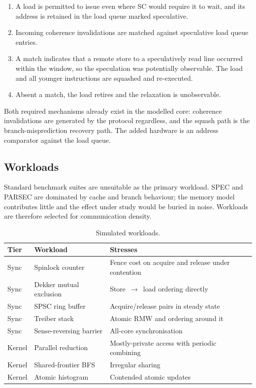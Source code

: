 \begin{enumerate}
\item A load is permitted to issue even where SC would require it to wait, and its
  address is retained in the load queue marked speculative.
\item Incoming coherence invalidations are matched against speculative load queue
  entries.
\item A match indicates that a remote store to a speculatively read line occurred
  within the window, so the speculation was potentially observable.
The load and
  all younger instructions are squashed and re-executed.
\item Absent a match, the load retires and the relaxation is unobservable.
\end{enumerate}

Both required mechanisms already exist in the modelled core: coherence
invalidations are generated by the protocol regardless, and the squash path is the
branch-misprediction recovery path.
The added hardware is an address comparator
against the load queue.

\subsection{Workloads}

Standard benchmark suites are unsuitable as the primary workload.
SPEC and PARSEC
are dominated by cache and branch behaviour; the memory model contributes little
and the effect under study would be buried in noise.
Workloads are therefore
selected for communication density.

\begin{table}[H]
\centering
\small
\caption{Simulated workloads.}
\label{tab:workloads}
\begin{tabular}{@{}llp{6.4cm}@{}}
\toprule
\textbf{Tier} & \textbf{Workload} & \textbf{Stresses} \\
\midrule
Sync    & Spinlock counter        & Fence cost on acquire and release under contention \\
Sync    & Dekker mutual exclusion & Store~$\to$~load ordering directly \\
Sync    & SPSC ring buffer        & Acquire/release pairs in steady state \\
Sync    & Treiber stack           & Atomic RMW and ordering around it \\
Sync    & Sense-reversing barrier & All-core synchronisation \\
Kernel  & Parallel reduction      & Mostly-private access with periodic combining \\
Kernel  & Shared-frontier BFS     & Irregular sharing \\
Kernel  & Atomic histogram        & Contended atomic updates \\
\bottomrule
\end{tabular}
\end{table}

